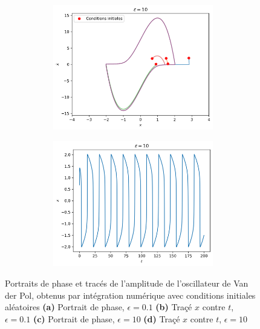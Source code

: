 \begin{figure}[t]
\begin{subfigure}[b]{0.9\textwidth}
    \end{subfigure}
    \centering
    \begin{subfigure}[b]{0.9\textwidth}
        \begin{subfigure}[b]{.47\textwidth}
            \includegraphics[width=\textwidth]{images/vdp/vanderpol_large.png}%
            \caption{}
        \end{subfigure}
        \hfill
        \begin{subfigure}[b]{.47\textwidth}
            \includegraphics[width=\textwidth]{images/vdp/vanderpol_large_x.png}%
            \caption{}
        \end{subfigure}
    \end{subfigure}
    
    \caption{Portraits de phase et tracés de l'amplitude de l'oscillateur de Van der Pol, obtenus par intégration numérique avec conditions initiales aléatoires \textbf{(a)} Portrait de phase, $\epsilon=0.1$ \textbf{(b)} Traçé $x$ contre $t$, $\epsilon=0.1$ \textbf{(c)} Portrait de phase, $\epsilon=10$ \textbf{(d)} Traçé $x$ contre $t$, $\epsilon=10$}
    \label{fig:portrait_vdp}
    
\end{figure}
